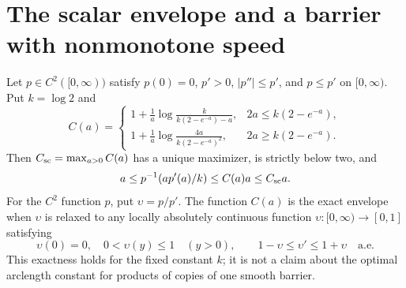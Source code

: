 \section{The scalar envelope and a barrier with nonmonotone speed}
\label{app:barrier-profiles}
\begin{proposition}[Exact envelope for a relaxed problem with constant $k=\log2$]
\label{prop:scalar-envelope}
Let $p\in C^2([0,\infty))$ satisfy $p(0)=0$, $p'>0$, $|p''|\leq p'$, and $p\leq p'$ on
$[0,\infty)$. Put $k=\log2$ and
\begin{equation}
 C(a)=\begin{cases}
 1+\displaystyle\frac1a\log\frac{k}{k(2-e^{-a})-a},
       &2a\leq k(2-e^{-a}),\\[5pt]
 1+\displaystyle\frac1a\log\frac{4a}{k(2-e^{-a})^2},
       &2a\geq k(2-e^{-a}).
 \end{cases}
 \label{eq:scalar-envelope-C}
\end{equation}
Then $C_{\mathrm{sc}}=\max_{a>0}C(a)$ has a unique maximizer, is strictly below two,
and
\[
 a\leq p^{-1}(ap'(a)/k)\leq C(a)a\leq C_{\mathrm{sc}}a.
\]
For the $C^2$ function $p$, put $\upsilon=p/p'$. The function $C(a)$ is
the exact envelope when $\upsilon$ is relaxed to any locally absolutely
continuous function $\upsilon:[0,\infty)\to[0,1]$ satisfying
\begin{equation}
 \upsilon(0)=0,\quad0<\upsilon(y)\leq1\quad(y>0),\qquad
 1-\upsilon\leq\upsilon'\leq1+\upsilon\quad\text{a.e.}
 \label{eq:upsilon-envelope}
\end{equation}
This exactness holds for the fixed constant $k$; it is not a claim about
the optimal arclength constant for products of copies of one smooth
barrier.
\end{proposition}
